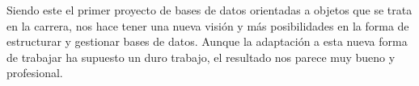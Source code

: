 Siendo este el primer proyecto de bases de datos orientadas a objetos que se trata en la carrera, nos hace tener una nueva visión y más posibilidades en la forma de estructurar y gestionar bases de datos. Aunque la adaptación a esta nueva forma de trabajar ha supuesto un duro trabajo, el resultado nos parece muy bueno y profesional.